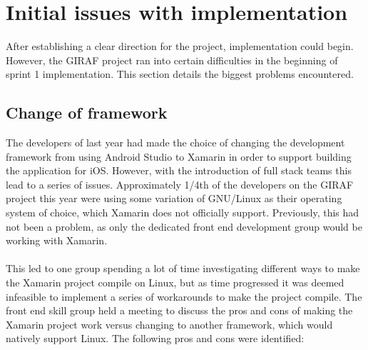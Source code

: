 \section{Initial issues with implementation}
After establishing a clear direction for the project, implementation could begin.
However, the GIRAF project ran into certain difficulties in the beginning of sprint 1 implementation.
This section details the biggest problems encountered.

\subsection{Change of framework}\label{change-of-framework}
The developers of last year had made the choice of changing the development framework from using Android Studio to Xamarin in order to support building the application for iOS.
However, with the introduction of full stack teams this lead to a series of issues. Approximately 1/4th of the developers on the GIRAF project this year were using some variation of GNU/Linux as their operating system of choice, which Xamarin does not officially support.
Previously, this had not been a problem, as only the dedicated front end development group would be working with Xamarin. 
\\\\
This led to one group spending a lot of time investigating different ways to make the Xamarin project compile on Linux, but as time progressed it was deemed infeasible to implement a series of workarounds to make the project compile.
The front end skill group held a meeting to discuss the pros and cons of making the Xamarin project work versus changing to another framework, which would natively support Linux.
The following pros and cons were identified:

